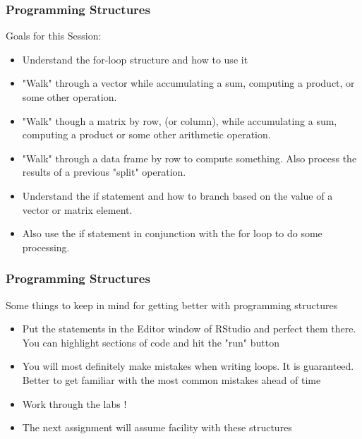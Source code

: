 \documentclass{beamer}
\begin{document}
\begin{frame}[fragile]
\frametitle{Programming Structures}
Goals for this Session:
\begin{itemize}
\item Understand the for-loop structure and how to use it 

\item "Walk" through a vector while accumulating a sum, computing a product, or some other operation.

\item "Walk" though a matrix by row, (or column), while accumulating a sum, computing a product or some other arithmetic operation.

\item "Walk" through a data frame by row to compute something. Also process the results of a previous "split" operation.

\item Understand the if statement and how to branch based on the value of a vector or matrix element. 

\item Also use the if statement in conjunction with the for loop to do some processing.

\end{itemize}
\end{frame}

%

\begin{frame}[fragile]
\frametitle{Programming Structures}
Some things to keep in mind for getting better with programming structures
\begin{itemize}
\item Put the statements in the Editor window of RStudio and perfect them there. You can highlight sections of code and hit the "run" button

\item You will most definitely make mistakes when writing loops. It is guaranteed. 
Better to get familiar with the most common mistakes ahead of time

\item Work through the labs ! 

\item The next assignment will assume facility with these structures
\end{itemize}
\end{frame}

%
\end{document}

